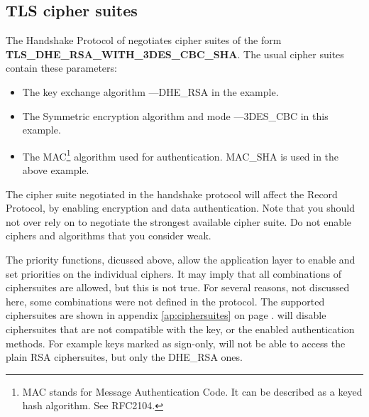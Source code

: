 \subsection{TLS cipher suites}
\par 
The Handshake Protocol of \tlsI{} negotiates cipher suites 
of the form \\
{\bf TLS\_DHE\_RSA\_WITH\_3DES\_CBC\_SHA}.
The usual cipher suites contain these parameters:
\begin{itemize}
\item The key exchange algorithm ---DHE\_RSA in the example.
\item The Symmetric encryption algorithm and mode ---3DES\_CBC in this
example.
\item The MAC\footnote{MAC stands for Message Authentication Code. It can
be described as a keyed hash algorithm. See RFC2104.} algorithm used for authentication.
MAC\_SHA is used in the above example.
\end{itemize}

The cipher suite negotiated in the handshake protocol will affect
the Record Protocol, by enabling encryption and data authentication.
Note that you should not over rely on \tls{} to negotiate the strongest 
available cipher suite. Do not enable ciphers and algorithms that you consider weak.
\par
The priority functions, dicussed above, allow the application layer to enable
and set priorities on the individual ciphers. It may imply that all combinations of ciphersuites
are allowed, but this is not true. For several reasons, not discussed here, some combinations 
were not defined in the \tls{} protocol. The supported ciphersuites are shown
in appendix \ref{ap:ciphersuites} on page \pageref{ap:ciphersuites}.
\gnutls{} will disable ciphersuites that are not compatible with the key, or
the enabled authentication methods.
For example keys marked as sign-only, will not be able to
access the plain RSA ciphersuites, but only the DHE\_RSA ones.

\addvspace{1.5cm}
